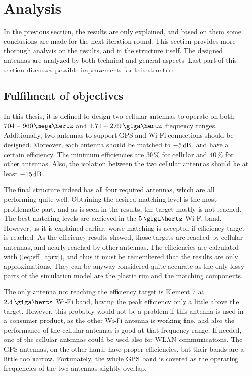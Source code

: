 \section{Analysis}
\label{sec:analysis}
In the previous section, the results are only explained, and based on them some conclusions are made for the next iteration round. This section provides more thorough analysis on the results, and in the structure itself. The designed antennas are analyzed by both technical and general aspects. Last part of this section discusses possible improvements for this structure.

\subsection{Fulfilment of objectives}
\label{sec:fulfilment}
In this thesis, it is defined to design two cellular antennas to operate on both $704-960\,\mega\hertz$ and $1.71-2.69\,\giga\hertz$ frequency ranges. Additionally, two antennas to support GPS and Wi-Fi connections should be designed. Moreover, each antenna should be matched to $-5\,\mathrm{dB}$, and have a certain efficiency. The minimum efficiencies are $30\,\%$ for cellular and $40\,\%$ for other antennas. Also, the isolation between the two cellular antennas should be at least $-15\,\mathrm{dB}$.

The final structure indeed has all four required antennas, which are all performing quite well. Obtaining the desired matching level is the most problematic part, and as is seen in the results, the target mostly is not reached. The best matching levels are achieved in the $5\,\giga\hertz$ Wi-Fi band. However, as it is explained earlier, worse matching is accepted if efficiency target is reached. As the efficiency results showed, those targets are reached by cellular antennas, and nearly reached by other antennas. The efficiencies are calculated with (\ref{eq:eff_aprx}), and thus it must be remembered that the results are only approximations. They can be anyway considered quite accurate as the only lossy parts of the simulation model are the plastic rim and the matching components. 

The only antenna not reaching the efficiency target is Element 7 at $2.4\,\giga\hertz$ Wi-Fi band, having the peak efficiency only a little above the target. However, this probably would not be a problem if this antenna is used in a consumer product, as the other Wi-Fi antenna is working fine, and also the performance of the cellular antennas is good at that frequency range. If needed, one of the cellular antennas could be used also for WLAN communications. The GPS antennas, on the other hand, have proper efficiencies, but their bands are a little too narrow. Fortunately, the whole GPS band is covered as the operating frequencies of the two antennas slightly overlap.

